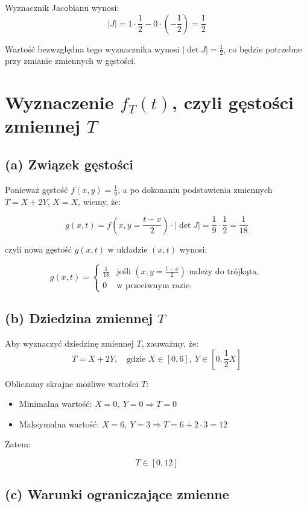 \documentclass{article}
\begin{document}
Wyznacznik Jacobianu wynosi:
\[
|J| = 1 \cdot \frac{1}{2} - 0 \cdot \left(-\frac{1}{2}\right) = \frac{1}{2}
\]

Wartość bezwzględna tego wyznacznika wynosi \( \left| \det J \right| = \frac{1}{2} \), co będzie potrzebne przy zmianie zmiennych w gęstości.

\section{Wyznaczenie \( f_T(t) \), czyli gęstości zmiennej \( T \)}

\subsection*{(a) Związek gęstości}

Ponieważ gęstość \( f(x, y) = \frac{1}{9} \), a po dokonaniu podstawienia zmiennych \( T = X + 2Y \), \( X = X \), wiemy, że:

\[
g(x, t) = f\left(x, y = \frac{t - x}{2}\right) \cdot \left| \det J \right| = \frac{1}{9} \cdot \frac{1}{2} = \frac{1}{18}
\]

czyli nowa gęstość \( g(x, t) \) w układzie \( (x, t) \) wynosi:

\[
g(x, t) = 
\begin{cases}
\frac{1}{18} & \text{jeśli } (x, y = \frac{t - x}{2}) \text{ należy do trójkąta}, \\
0 & \text{w przeciwnym razie}.
\end{cases}
\]

\subsection*{(b) Dziedzina zmiennej \( T \)}

Aby wyznaczyć dziedzinę zmiennej \( T \), zauważmy, że:
\[
T = X + 2Y, \quad \text{gdzie } X \in [0, 6],\ Y \in \left[0, \frac{1}{2}X\right]
\]

Obliczamy skrajne możliwe wartości \( T \):
\begin{itemize}
    \item Minimalna wartość: \( X = 0,\ Y = 0 \Rightarrow T = 0 \)
    \item Maksymalna wartość: \( X = 6,\ Y = 3 \Rightarrow T = 6 + 2 \cdot 3 = 12 \)
\end{itemize}

Zatem:

\[
T \in [0, 12]
\]

\subsection*{(c) Warunki ograniczające zmienne}
\end{document}
